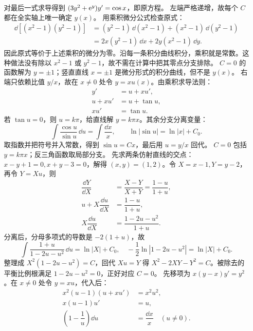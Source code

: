 对最后一式求导得到 $(3y^2+\mathrm e^y)y'=\cos x$，即原方程。
左端严格递增，故每个 $C$ 都在全实轴上唯一确定 $y(x)$。
用乘积微分公式检查原式：
\[
\begin{aligned}
\dd[(x^2-1)(y^2-1)]
 &=(y^2-1)\,\dd(x^2-1)+(x^2-1)\,\dd(y^2-1)\\
 &=2x(y^2-1)\,\dd x+2y(x^2-1)\,\dd y.
\end{aligned}
\]
因此原式等价于上述乘积的微分为零。沿每一条积分曲线积分，乘积就是常数。这种做法没有除以 $x^2-1$ 或 $y^2-1$，故不需在计算中把其零点分支排除。
$C=0$ 的函数解为 $y=\pm1$；竖直直线 $x=\pm1$ 是微分形式的积分曲线，但不是 $y(x)$。
右端只依赖比值 $y/x$，故在 $x\ne0$ 处令 $y=xu(x)$。由乘积求导法则：
\[
\begin{aligned}
y'&=u+xu',\\
u+xu'&=u+\tan u,\\
xu'&=\tan u.
\end{aligned}
\]
若 $\tan u=0$，则 $u=k\pi$，给直线解 $y=k\pi x$。其余分支分离变量：
\[
\int\dfrac{\cos u}{\sin u}\,\dd u=\int\dfrac{\dd x}x,
\qquad \ln|\sin u|=\ln|x|+C_0.
\]
取指数并把符号并入常数，得到 $\sin u=Cx$，最后用 $u=y/x$ 回代。
$C=0$ 包括 $y=k\pi x$；反三角函数取局部分支。
先求两条仿射直线的交点：$x-y+1=0,x+y-3=0$，解得 $(x,y)=(1,2)$。令 $X=x-1,Y=y-2$，再令 $Y=Xu$，则
\[
\begin{aligned}
\dfrac{\dd Y}{\dd X}&=\dfrac{X-Y}{X+Y}=\dfrac{1-u}{1+u},\\
u+X\dfrac{\dd u}{\dd X}&=\dfrac{1-u}{1+u},\\
X\dfrac{\dd u}{\dd X}&=\dfrac{1-2u-u^2}{1+u}.
\end{aligned}
\]
分离后，分母多项式的导数是 $-2(1+u)$，故
\[
\int\dfrac{1+u}{1-2u-u^2}\,\dd u=\ln|X|+C_0,
\quad -\dfrac12\ln|1-2u-u^2|=\ln|X|+C_0.
\]
整理成 $X^2(1-2u-u^2)=C$，回代 $Xu=Y$ 得 $X^2-2XY-Y^2=C$。被除去的平衡比例根满足 $1-2u-u^2=0$，正好对应 $C=0$。
先移项为 $x(y-x)y'=y^2$。在 $x\ne0$ 处令 $y=xu$，代入后：
\[
\begin{aligned}
x^2(u-1)(u+xu')&=x^2u^2,\\
x(u-1)u'&=u,\\
\left(1-\dfrac1u\right)\dd u&=\dfrac{\dd x}x \quad(u\ne0).
\end{aligned}
\]
